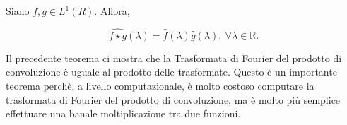 \begin{theorem}
    Siano $f, g \in L^1(R)$. Allora,

    $$
        \widehat{f \star g}(\lambda) = \hat{f}(\lambda) \hat{g}(\lambda), \
        \forall \lambda \in \mathbb{R}.
    $$
\end{theorem}

Il precedente teorema ci mostra che la Trasformata di Fourier del prodotto di
convoluzione è uguale al prodotto delle trasformate. Questo è un importante teorema
perchè, a livello computazionale, è molto costoso computare la trasformata di Fourier
del prodotto di convoluzione, ma è molto più semplice effettuare una banale moltiplicazione
tra due funzioni.